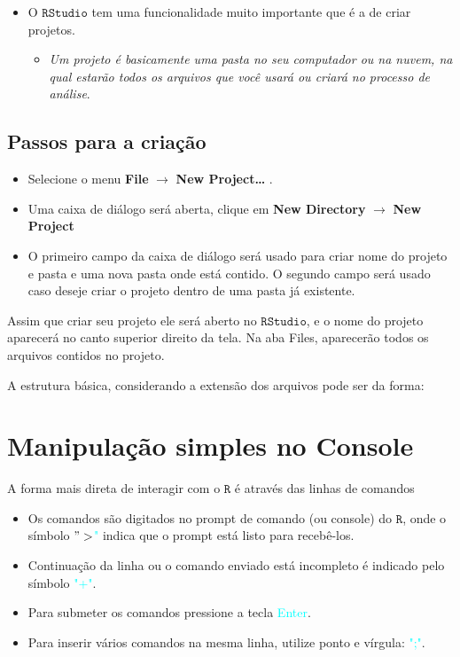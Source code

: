 \documentclass[
]{book}
\providecommand{\tightlist}{%
  \setlength{\itemsep}{0pt}\setlength{\parskip}{0pt}}
\begin{document}
\begin{itemize}
\item
  O \(\texttt{RStudio}\) tem uma funcionalidade muito importante que é a de criar projetos.

  \begin{itemize}
  \tightlist
  \item
    \emph{Um projeto é basicamente uma pasta no seu computador ou na nuvem, na qual estarão todos os arquivos que você usará ou criará no processo de análise}.
  \end{itemize}
\end{itemize}

\hypertarget{passos-para-a-criauxe7uxe3o}{%
\subsection{Passos para a criação}\label{passos-para-a-criauxe7uxe3o}}

\begin{itemize}
\item
  Selecione o menu \textbf{File} \(\rightarrow\) \textbf{New Project\ldots{}} .
\item
  Uma caixa de diálogo será aberta, clique em \textbf{New Directory} \(\rightarrow\) \textbf{New Project}
\item
  O primeiro campo da caixa de diálogo será usado para criar nome do projeto e pasta e uma nova pasta onde está contido. O segundo campo será usado caso deseje criar o projeto dentro de uma pasta já existente.
\end{itemize}

Assim que criar seu projeto ele será aberto no \(\texttt{RStudio}\), e o nome do projeto aparecerá no canto superior direito da tela. Na aba Files, aparecerão todos os arquivos contidos no projeto.

A estrutura básica, considerando a extensão dos arquivos pode ser da forma:

\hypertarget{manipulauxe7uxe3o-simples-no-console}{%
\section{\texorpdfstring{Manipulação simples no \textbf{Console}}{Manipulação simples no Console}}\label{manipulauxe7uxe3o-simples-no-console}}

A forma mais direta de interagir com o \(\texttt{R}\) é através das linhas de comandos

\begin{itemize}
\tightlist
\item
  Os comandos são digitados no prompt de comando (ou console) do \(\texttt{R}\), onde o símbolo \textcolor{cyan}{$">$"} indica que o prompt está listo para recebê-los.
\item
  Continuação da linha ou o comando enviado está incompleto é indicado pelo símbolo \textcolor{cyan}{"+"}.
\item
  Para submeter os comandos pressione a tecla \textcolor{cyan}{Enter}.
\item
  Para inserir vários comandos na mesma linha, utilize ponto e vírgula: \textcolor{cyan}{";"}.
\end{itemize}
\end{document}

